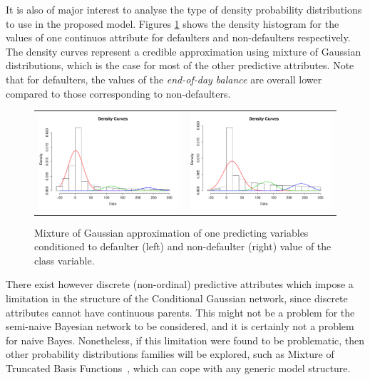 It is also of major interest to analyse the type of density probability distributions to use in the proposed model. Figures \ref{Figure:cajamarMixt} shows the density histogram for the values of one continuos attribute for defaulters and non-defaulters respectively. The density curves represent a credible approximation using mixture of Gaussian distributions, which is the case for most of the other predictive attributes. Note that for defaulters, the values of the \emph{end-of-day balance} are overall lower compared to those corresponding to non-defaulters.

\begin{figure}[htbp]
  \centering
    \begin{tabular}{cc}
    \includegraphics[width=70mm]{figures/CajaMarmixtureBalanceDef}&
    \includegraphics[width=70mm]{figures/CajaMarmixtureBalanceNonDef}\\
  \end{tabular}
    \caption{\label{Figure:cajamarMixt}Mixture of Gaussian approximation of one predicting variables conditioned to defaulter (left) and non-defaulter (right) value of the class variable.}
\end{figure}

There exist however discrete (non-ordinal) predictive attributes which impose a limitation in the structure of the Conditional Gaussian network, since discrete attributes cannot have continuous parents. This might not be a problem for the semi-naive Bayesian network to be considered, and it is certainly not a problem for naive Bayes. Nonetheless, if this limitation were found to be problematic, then other probability distributions families will be explored, such as Mixture of Truncated Basis Functions~\cite{Lan12}, which can cope with any generic model structure. 

